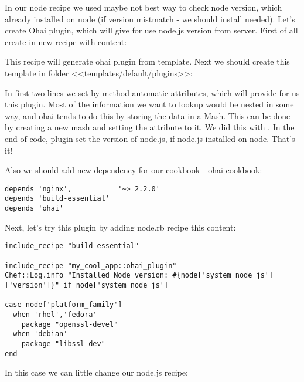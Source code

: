 In our node recipe we used maybe not best way to check node version, which already installed on node (if version mistmatch - we should install needed). Let's create Ohai plugin, which will give for use node.js version from server. First of all create in  new recipe  with content:



This recipe will generate ohai plugin from  template. Next we should create this template in folder <<templates/default/plugins>>:



In first two lines we set by method  automatic attributes, which will provide for us this plugin.
Most of the information we want to lookup would be nested in some way, and ohai tends to do this by storing the data in a Mash. This can be done by creating a new mash and setting the attribute to it. We did this with . In the end of code, plugin set the version of node.js, if node.js installed on node. That's it!

Also we should add new dependency for our cookbook - ohai cookbook:

\begin{lstlisting}[label=lst:cookbook-ohai5]
depends 'nginx',           '~> 2.2.0'
depends 'build-essential'
depends 'ohai'
\end{lstlisting}

Next, let's try this plugin by adding node.rb recipe this content:

\begin{lstlisting}[label=lst:cookbook-ohai6]
include_recipe "build-essential"

include_recipe "my_cool_app::ohai_plugin"
Chef::Log.info "Installed Node version: #{node['system_node_js']['version']}" if node['system_node_js']

case node['platform_family']
  when 'rhel','fedora'
    package "openssl-devel"
  when 'debian'
    package "libssl-dev"
end
\end{lstlisting}

In this case we can little change our node.js recipe:


